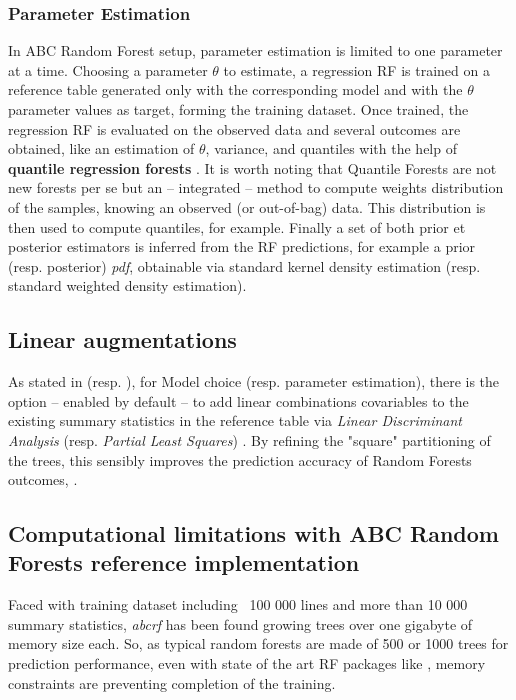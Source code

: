 \documentclass[long, final]{jobim}
\begin{document}
\subsubsection{Parameter Estimation}
\label{sec:abcrf-estimparam}

In ABC Random Forest setup, parameter estimation is limited to one parameter at a time. Choosing a parameter $\theta$ to estimate, a regression RF is trained on a reference table generated only with the corresponding model and with the $\theta$ parameter values as target, forming the training dataset. Once trained, the regression RF is evaluated on the observed data and several outcomes are obtained, like an estimation of $\theta$, variance, and quantiles with the help of \textbf{quantile regression forests} \cite{meinshausen2006quantile}. It is worth noting that Quantile Forests are not new forests per se but an -- integrated -- method to compute weights distribution of the samples, knowing an observed (or out-of-bag) data. This distribution is then used to compute quantiles, for example. Finally a set of both prior et posterior estimators is inferred from the RF predictions, for example a prior (resp. posterior) \emph{pdf}, obtainable via standard kernel density estimation (resp. standard weighted density estimation).

\subsection{Linear augmentations}
\label{sec:linear}

As stated in \cite{pudlo2015reliable} (resp. \cite{raynal2016abc}), for Model choice (resp. parameter estimation), there is the option -- enabled by default --  to add linear combinations covariables to the existing summary statistics in the reference table via \emph{Linear Discriminant Analysis} (resp. \emph{Partial Least Squares}) \cite{friedman2001elements}. By refining the "square" partitioning of the trees, this sensibly improves the prediction accuracy of Random Forests outcomes, . 

\subsection{Computational limitations with ABC Random Forests reference implementation}
\label{sec:challenges-abcrf}

Faced with training dataset including ~100 000 lines and more than 10 000 summary statistics, \emph{abcrf} has been found growing trees over one gigabyte of memory size each. So, as typical random forests are made of 500 or 1000 trees for prediction performance, even with state of the art RF packages like \cite{wright2015ranger}, memory constraints are preventing completion of the training. 
\end{document}
